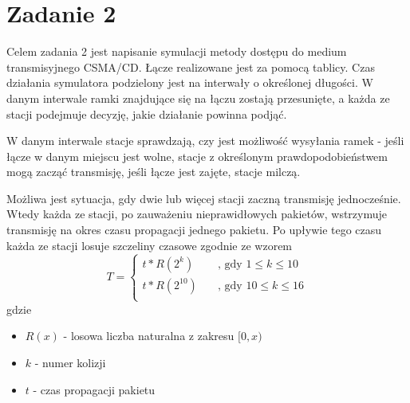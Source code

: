 \documentclass[titlepage]{article}
\begin{document}
\section{Zadanie 2}
Celem zadania 2 jest napisanie symulacji metody dostępu do medium transmisyjnego CSMA/CD. Łącze realizowane jest za pomocą tablicy. Czas działania symulatora podzielony jest na interwały o określonej długości. W danym interwale ramki znajdujące się na łączu zostają przesunięte, a każda ze stacji podejmuje decyzję, jakie działanie powinna podjąć. 

W danym interwale stacje sprawdzają, czy jest możliwość wysyłania ramek - jeśli łącze w danym miejscu jest wolne, stacje z określonym prawdopodobieństwem mogą zacząć transmisję, jeśli łącze jest zajęte, stacje milczą.

Możliwa jest sytuacja, gdy dwie lub więcej stacji zaczną transmisję jednocześnie. Wtedy każda ze stacji, po zauważeniu nieprawidłowych pakietów, wstrzymuje transmisję na okres czasu propagacji jednego pakietu. Po upływie tego czasu każda ze stacji losuje szczeliny czasowe zgodnie ze wzorem 
\newpage
\[   
T = 
     \begin{cases}
       t * R(2^k) &\quad\text{, gdy }1 \leq k \leq 10\\
       t * R(2^{10}) &\quad\text{, gdy }10 \leq k \leq 16\\
     \end{cases}
\]
gdzie
\begin{itemize}
\itemsep0em
\item $R(x)$ - losowa liczba naturalna z zakresu $[0, x)$
\item $k$ - numer kolizji
\item $t$ - czas propagacji pakietu
\end{itemize}
\end{document}
